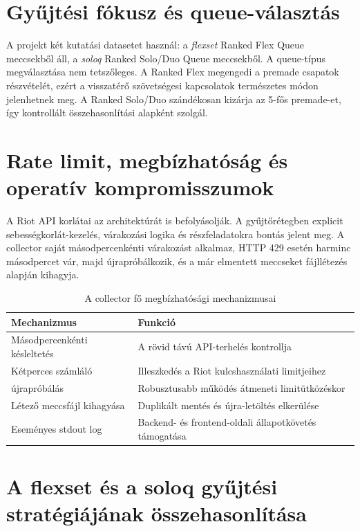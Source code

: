 \section{Gyűjtési fókusz és queue-választás}

A projekt két kutatási datasetet használ: a \textit{flexset} Ranked Flex Queue meccsekből áll, a \textit{soloq} Ranked Solo/Duo Queue meccsekből. A queue-típus megválasztása nem tetszőleges. A Ranked Flex megengedi a premade csapatok részvételét, ezért a visszatérő szövetségesi kapcsolatok természetes módon jelenhetnek meg. A Ranked Solo/Duo szándékosan kizárja az 5-fős premade-et, így kontrollált összehasonlítási alapként szolgál.

\section{Rate limit, megbízhatóság és operatív kompromisszumok}

A Riot API korlátai az architektúrát is befolyásolják. A gyűjtőrétegben explicit sebességkorlát-kezelés, várakozási logika és részfeladatokra bontás jelent meg. A collector saját másodpercenkénti várakozást alkalmaz, HTTP 429 esetén harminc másodpercet vár, majd újrapróbálkozik, és a már elmentett meccseket fájllétezés alapján kihagyja.

\begin{table}[H]
\centering
\caption{A collector fő megbízhatósági mechanizmusai}
\begin{tabularx}{\textwidth}{>{\raggedright\arraybackslash}p{4.4cm}|X}
\toprule
\textbf{Mechanizmus} & \textbf{Funkció} \\
\midrule
Másodpercenkénti késleltetés & A rövid távú API-terhelés kontrollja \\
Kétperces számláló & Illeszkedés a Riot kulcshasználati limitjeihez \\
429 újrapróbálás & Robusztusabb működés átmeneti limitütközéskor \\
Létező meccsfájl kihagyása & Duplikált mentés és újra-letöltés elkerülése \\
Eseményes stdout log & Backend- és frontend-oldali állapotkövetés támogatása \\
\bottomrule
\end{tabularx}
\end{table}

\section{A flexset és a soloq gyűjtési stratégiájának összehasonlítása}

